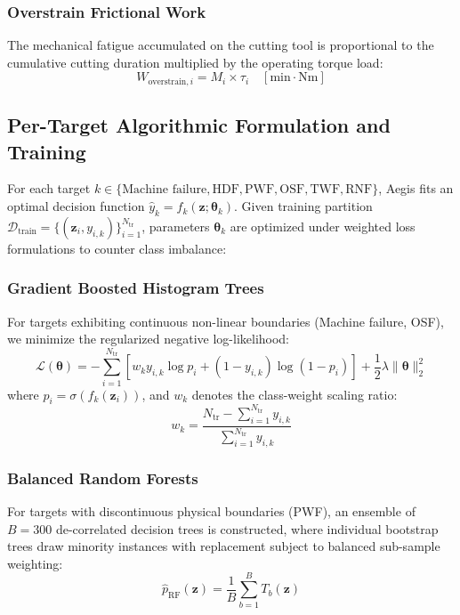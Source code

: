 \documentclass[conference]{IEEEtran}
\begin{document}
\subsubsection{Overstrain Frictional Work}
The mechanical fatigue accumulated on the cutting tool is proportional to the cumulative cutting duration multiplied by the operating torque load:
\begin{equation}
W_{\text{overstrain}, i} = M_i \times \tau_i \quad [\text{min}\cdot\text{Nm}]
\label{eq:overstrain}
\end{equation}

\subsection{Per-Target Algorithmic Formulation and Training}
For each target $k \in \{\text{Machine failure}, \text{HDF}, \text{PWF}, \text{OSF}, \text{TWF}, \text{RNF}\}$, Aegis fits an optimal decision function $\hat{y}_k = f_k(\mathbf{z}; \boldsymbol{\theta}_k)$. Given training partition $\mathcal{D}_{\text{train}} = \{(\mathbf{z}_i, y_{i,k})\}_{i=1}^{N_{\text{tr}}}$, parameters $\boldsymbol{\theta}_k$ are optimized under weighted loss formulations to counter class imbalance:

\subsubsection{Gradient Boosted Histogram Trees}
For targets exhibiting continuous non-linear boundaries (Machine failure, OSF), we minimize the regularized negative log-likelihood:
\begin{equation}
\mathcal{L}(\boldsymbol{\theta}) = -\sum_{i=1}^{N_{\text{tr}}} \left[ w_k y_{i,k} \log p_i + (1 - y_{i,k}) \log(1 - p_i) \right] + \frac{1}{2}\lambda \|\boldsymbol{\theta}\|_2^2
\end{equation}
where $p_i = \sigma(f_k(\mathbf{z}_i))$, and $w_k$ denotes the class-weight scaling ratio:
\begin{equation}
w_k = \frac{N_{\text{tr}} - \sum_{i=1}^{N_{\text{tr}}} y_{i,k}}{\sum_{i=1}^{N_{\text{tr}}} y_{i,k}}
\end{equation}

\subsubsection{Balanced Random Forests}
For targets with discontinuous physical boundaries (PWF), an ensemble of $B = 300$ de-correlated decision trees is constructed, where individual bootstrap trees draw minority instances with replacement subject to balanced sub-sample weighting:
\begin{equation}
\hat{p}_{\text{RF}}(\mathbf{z}) = \frac{1}{B} \sum_{b=1}^B T_b(\mathbf{z})
\end{equation}
\end{document}
